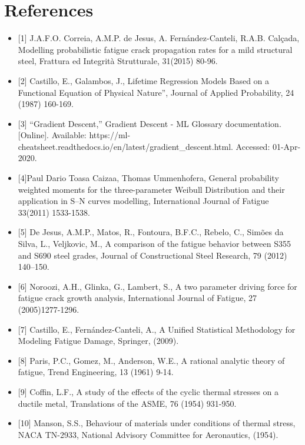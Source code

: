 \documentclass[11pt]{article}
\providecommand{\tightlist}{%
      \setlength{\itemsep}{0pt}\setlength{\parskip}{0pt}}
\begin{document}
\hypertarget{references}{%
\section{References}\label{references}}

\begin{itemize}
\tightlist
\item
  {[}1{]} J.A.F.O. Correia, A.M.P. de Jesus, A. Fernández-Canteli,
  R.A.B. Calçada, Modelling probabilistic fatigue crack propagation
  rates for a mild structural steel, Frattura ed Integrità Strutturale,
  31(2015) 80-96.
\item
  {[}2{]} Castillo, E., Galambos, J., Lifetime Regression Models Based
  on a Functional Equation of Physical Nature'', Journal of Applied
  Probability, 24 (1987) 160-169.
\item
  {[}3{]} ``Gradient Descent,'' Gradient Descent - ML Glossary
  documentation. {[}Online{]}. Available:
  https://ml-cheatsheet.readthedocs.io/en/latest/gradient\_descent.html.
  Accessed: 01-Apr-2020.
\item
  {[}4{]}Paul Dario Toasa Caizaa, Thomas Ummenhofera, General
  probability weighted moments for the three-parameter Weibull
  Distribution and their application in S--N curves modelling,
  International Journal of Fatigue 33(2011) 1533-1538.
\item
  {[}5{]} De Jesus, A.M.P., Matos, R., Fontoura, B.F.C., Rebelo, C.,
  Simões da Silva, L., Veljkovic, M., A comparison of the fatigue
  behavior between S355 and S690 steel grades, Journal of Constructional
  Steel Research, 79 (2012) 140--150.
\item
  {[}6{]} Noroozi, A.H., Glinka, G., Lambert, S., A two parameter
  driving force for fatigue crack growth analysis, International Journal
  of Fatigue, 27 (2005)1277-1296.
\item
  {[}7{]} Castillo, E., Fernández-Canteli, A., A Unified Statistical
  Methodology for Modeling Fatigue Damage, Springer, (2009).
\item
  {[}8{]} Paris, P.C., Gomez, M., Anderson, W.E., A rational analytic
  theory of fatigue, Trend Engineering, 13 (1961) 9-14.
\item
  {[}9{]} Coffin, L.F., A study of the effects of the cyclic thermal
  stresses on a ductile metal, Translations of the ASME, 76 (1954)
  931-950.
\item
  {[}10{]} Manson, S.S., Behaviour of materials under conditions of
  thermal stress, NACA TN-2933, National Advisory Committee for
  Aeronautics, (1954).

\end{itemize}
\end{document}
